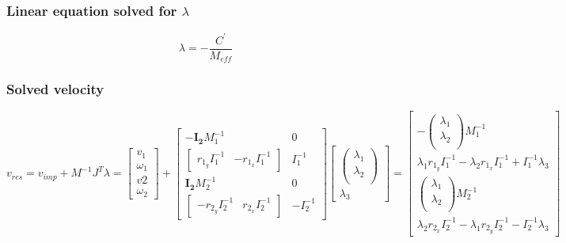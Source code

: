 \documentclass{article}
\begin{document}
	\subsubsection{Linear equation solved for $\lambda$}
		$$
			\lambda=-\frac{C^{'}}{M_{eff}}
		$$
	\subsubsection{Solved velocity}
		$$
			v_{res}=v_{imp}+M^{-1}J^T\lambda=
			\begin{bmatrix}
				v_1\\
				\omega_1\\
				v2\\
				\omega_2
			\end{bmatrix}
			+
			\begin{bmatrix}
				-\boldsymbol{I_2}M_1^{-1} & 0\\
				\begin{bmatrix}
					r_{1_y}I_1^{-1} & -r_{1_x}I_1^{-1}
				\end{bmatrix} 
				& I_1^{-1}\\
				\boldsymbol{I_2}M_2^{-1} & 0\\
				\begin{bmatrix}
					-r_{2_y}I_2^{-1} & r_{2_x}I_2^{-1}
				\end{bmatrix} 
				& -I_2^{-1}
			\end{bmatrix}
			\begin{bmatrix}
				\begin{pmatrix}
					\lambda_1\\
					\lambda_2\\
				\end{pmatrix}\\
				\lambda_3
			\end{bmatrix}
			=
			\begin{bmatrix}
				-
				\begin{pmatrix}
					\lambda_1\\
					\lambda_2\\
				\end{pmatrix}M_1^{-1}\\
				\lambda_1r_{1_y}I_1^{-1} - \lambda_2r_{1_x}I_1^{-1} + I_1^{-1}\lambda_3\\
				\begin{pmatrix}
					\lambda_1\\
					\lambda_2\\
				\end{pmatrix}M_2^{-1}\\
				\lambda_2r_{2_x}I_2^{-1} - \lambda_1r_{2_y}I_2^{-1} - I_2^{-1}\lambda_3
			\end{bmatrix}
		$$
		\newpage
\end{document}
